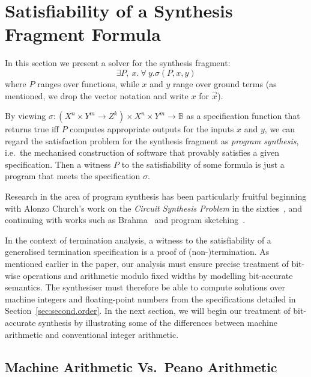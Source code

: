 \documentclass[preprint]{sigplanconf}
\theoremstyle{definition}
\begin{document}


\section{Satisfiability of a Synthesis Fragment Formula} \label{sec:synthesis}

In this section we present a solver for the synthesis fragment:
%
\[
  \exists P,~ x . ~\forall~ y . \sigma(P, x, y)
\]
%
where $P$ ranges over functions, while $x$ and $y$ range over ground terms
(as mentioned, we drop the vector notation and write $x$ for $\vec{x}$).

By viewing $\sigma: (X^n \times Y^m \to Z^k) \times X^n \times Y^m  \to
\mathbb{B}$ as a specification function that returns true iff $P$ computes
appropriate outputs for the inputs $x$ and $y$, we can regard the
satisfaction problem for the synthesis fragment as \emph{program synthesis},
i.e.~the mechanised construction of software that provably satisfies a
given specification.  Then a witness $P$ to the satisfiability of some
formula is just a program that meets the specification $\sigma$.

Research in the area of program synthesis has been
particularly fruitful beginning with Alonzo Church's work on the
\emph{Circuit Synthesis Problem} in the sixties~\cite{church-synth}, and
continuing with works such as {\sc Brahma}~\cite{brahma} and program
sketching~\cite{lezama-thesis,sketch,modular-sketch}.

In the context of termination analysis, a witness to the
satisfiability of a generalised termination specification is a
proof of \mbox{(non-)termination}.  As mentioned earlier in the paper, our
analysis must ensure precise treatment of bit-wise operations and arithmetic
modulo fixed widths by modelling bit-accurate semantics.  The synthesiser
must therefore be able to compute solutions over machine
integers and floating-point numbers from the specifications detailed in
Section~\ref{sec:second.order}.  In the next section, we will begin our treatment of
bit-accurate synthesis by illustrating some of the differences between
machine arithmetic and conventional integer arithmetic.


\subsection{Machine Arithmetic Vs.~Peano Arithmetic} \label{sec:machine.arith} 
\end{document}
